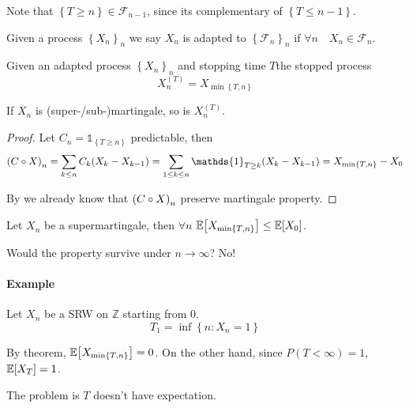 Note that $\left\{ T \geq n\right\} \in \mathcal{F}_{n-1}$, since its complementary of $\left\{ T \leq n-1\right\} $.
\begin{definition}
	Given a process $\left\{ X_n \right\}_n$ we say $X_n$ is adapted to $\left\{ \mathcal{F}_n \right\}_n$ if $\forall n \quad X_n\in \mathcal{F}_n$.
\end{definition}
\begin{definition}
Given an adapted process $\left\{ X_n \right\}_n$ and stopping time $T$the stopped process $$ X_n^{(T)} = X_{\min\left\{ T,n \right\}} $$
\end{definition}

\begin{lemma}
	If $X_n$ is (super-/sub-)martingale, so is $X_n^{(T)}$.
	\begin{proof}
		Let $C_n = \mathds{1}_{\left\{ T\geq n \right\}}$ predictable, then
		$$\qty(C \circ X)_n = \sum_{k\leq n} C_k\qty(X_k -X_{k-1}) = \sum_{1\leq k\leq n} \mathds{1}_{T\geq k} (X_k-X_{k-1}) = X_{\min\left\{ T,n \right\}} - X_0$$
		
		By we already know that $\qty(C \circ X)_n$ preserve martingale property.
	\end{proof}
\end{lemma}

\begin{theorem}
	Let $X_n$ be a supermartingale, then $\forall n$ $\mathbb{E} \qty[X_{\min\left\{ T,n \right\}}] \leq \mathbb{E} \qty[X_0]$.
\end{theorem}

Would the property survive under $n\to \infty$? No!

\paragraph{Example}
Let $X_n$ be a SRW on $\mathbb{Z}$ starting from $0$.
$$T_1 = \inf \left\{ n: X_n=1 \right\}$$

By theorem, $\mathbb{E} \qty[X_{\min\left\{ T,n \right\}}] = 0$. On the other hand, since $P(T<\infty) = 1$, $\mathbb{E} \qty[X_T]  =1$.

The problem is $T$ doesn't have expectation.

